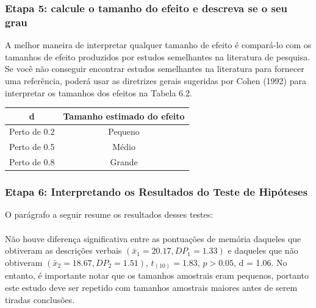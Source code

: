 \documentclass[11pt]{beamer}
\begin{document}
\begin{frame}
\frametitle{Etapa 5: calcule o tamanho do efeito e descreva se o seu grau}
A melhor maneira de interpretar qualquer tamanho de efeito é compará-lo com os tamanhos de efeito produzidos por estudos semelhantes na literatura de pesquisa. Se você não conseguir encontrar estudos semelhantes na literatura para fornecer uma referência, poderá usar as diretrizes gerais sugeridas por Cohen (1992) para interpretar os tamanhos dos efeitos na Tabela 6.2.

\begin{center}
\begin{tabular}{cc} 
 \hline
d  & Tamanho estimado do efeito\\
 \hline
Perto de 0.2 & Pequeno \\
Perto de 0.5 & Médio \\
Perto de 0.8 & Grande \\
 \hline
\end{tabular}
\end{center}   

\end{frame}

\begin{frame}
\frametitle{Etapa 6: Interpretando os Resultados do Teste de Hipóteses}

O parágrafo a seguir resume os resultados desses testes:\\~\\
Não houve diferença significativa entre as pontuações de memória daqueles que obtiveram as descrições verbais $(\bar{x}_1 = 20.17, DP_1 = 1.33)$ e daqueles que não obtiveram $(\bar{x}_2 = 18.67, DP_2 = 1.51)$, $t_{(10)} = 1.83$, $p > 0.05$, d = 1.06. No entanto, é importante notar que os tamanhos amostrais eram pequenos, portanto este estudo deve ser repetido com tamanhos amostrais maiores antes de serem tiradas conclusões.
\end{frame}
\end{document}
